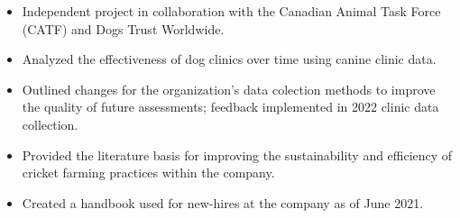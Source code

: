 \documentclass[10pt,a4paper,ragged2e]{altacv}
\begin{document}

\begin{fullwidth}
\makecvheader
\end{fullwidth}




\begin{itemize}
\item Independent project in collaboration with the Canadian Animal Task Force (CATF) and Dogs Trust Worldwide.
\item Analyzed the effectiveness of dog clinics over time using canine clinic data.
\item Outlined changes for the organization's data colection methods to improve the quality of future assessments; feedback implemented in 2022 clinic data collection.
\end{itemize}
\divider\small

\begin{itemize}
\item Provided the literature basis for improving the sustainability and efficiency of cricket farming practices within the company.
\item Created a handbook used for new-hires at the company as of June 2021.
\end{itemize} 
\end{document}
